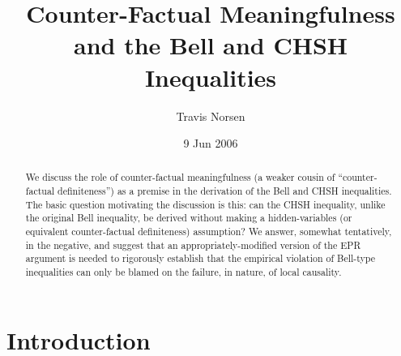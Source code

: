 \documentclass[aps,prc,onecolumn,12pt,nofootinbib]{revtex4-2}
\begin{document}
\title{Counter-Factual Meaningfulness and the Bell and CHSH Inequalities}
\author{Travis Norsen}

\date{9 Jun 2006}

\begin{abstract}
We discuss the role of counter-factual meaningfulness (a weaker
cousin of ``counter-factual definiteness'') as a premise in
the derivation of the Bell and CHSH inequalities.  The basic question
motivating the discussion is this:  can the CHSH inequality, unlike
the original Bell inequality, be derived without making a
hidden-variables (or equivalent counter-factual definiteness)
assumption?  We answer, somewhat tentatively, in the negative, and
suggest that an appropriately-modified version of the EPR argument is
needed to rigorously establish that the empirical violation of
Bell-type inequalities can only be blamed on the failure, in nature,
of local causality.
\end{abstract}

\maketitle

\newpage

\section{Introduction}
\label{intro}
\end{document}

